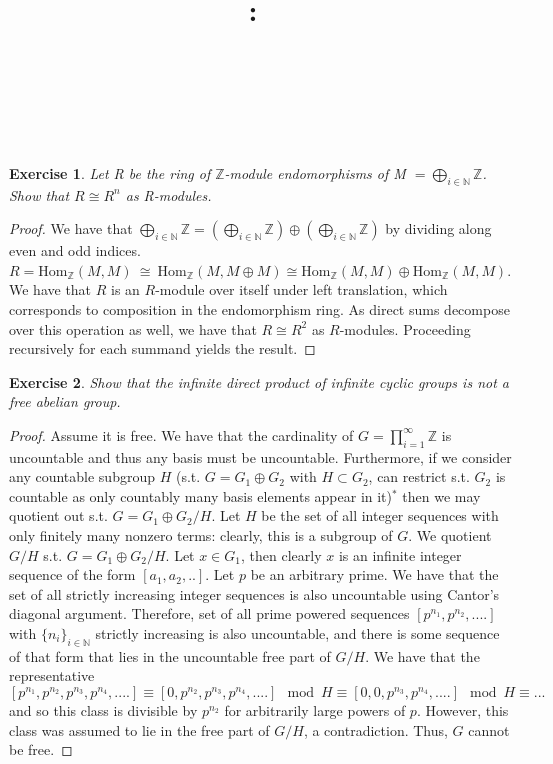 \documentclass{article}
\title{
    \vspace{2in}
    \textmd{\textbf{\hmwkClass:\ \hmwkTitle}}\\
    \vspace{0.1in}
    \textmd{\hmwkDueDate} \\
    \vspace{0.2in}\large{\textit{\hmwkClassInstructor\  }}
    \vspace{2in}
}
\author{\hmwkAuthorName}
\date{}
\newcommand{\Hom}{\text{Hom}}
\newtheorem{exercise}{Exercise}
\begin{document}
\maketitle

\pagebreak
\begin{exercise}
  Let R be the ring of $\mathbb{Z}$-module endomorphisms of M $= \bigoplus_{i \in \mathbb{N}}\mathbb{Z}$. Show that $R \cong R^{n}$ as R-modules.
\end{exercise}

\begin{proof}
  We have that $\bigoplus_{i\in \mathbb{N}}\mathbb{Z} = (\bigoplus_{i\in \mathbb{N}}\mathbb{Z})  \oplus (\bigoplus_{i\in \mathbb{N}}\mathbb{Z})$ by dividing along even and odd indices. $R = \Hom_{\mathbb{Z}}(M, M) \ \cong \ \Hom_{\mathbb{Z}}(M, M \oplus M) \cong \Hom_{\mathbb{Z}}(M,M) \oplus \Hom_{\mathbb{Z}}(M,M)$. We have that $R$ is an $R$-module over itself under left translation, which corresponds to composition in the endomorphism ring. As direct sums decompose over this operation as well, we have that $R \cong R^{2}$ as $R$-modules. Proceeding recursively for each summand yields the result.
\end{proof}

\begin{exercise}
  Show that the infinite direct product of infinite cyclic groups is not a free abelian group.
\end{exercise}

\begin{proof}
  Assume it is free. We have that the cardinality of $G = \prod_{i=1}^{\infty}\mathbb{Z}$ is uncountable and thus any basis must be uncountable. Furthermore, if we consider any countable subgroup $H$ (s.t. $G = G_{1} \oplus G_{2}$ with $H \subset G_{2}$, can restrict s.t. $G_{2}$ is countable as only countably many basis elements appear in it)$^{*}$ then we may quotient out s.t. $G = G_{1} \oplus G_{2}/H$. Let $H$ be the set of all integer sequences with only finitely many nonzero terms: clearly, this is a subgroup of $G$. We quotient $G/H$ s.t. $G = G_{1} \oplus G_{2}/H$. Let $x \in G_{1}$, then clearly $x$ is an infinite integer sequence of the form $[a_{1},a_{2},..]$. Let $p$ be an arbitrary prime. We have that the set of all strictly increasing integer sequences is also uncountable using Cantor's diagonal argument. Therefore, set of all prime powered sequences $[p^{n_{1}}, p^{n_{2}},....]$ with $\{n_{i}\}_{i\in \mathbb{N}}$ strictly increasing is also uncountable, and there is some sequence of that form that lies in the uncountable free part of $G/H$. We have that the representative $[p^{n_{1}}, p^{n_{2}}, p^{n_{3}}, p^{n_{4}},....] \equiv [0, p^{n_{2}}, p^{n_{3}}, p^{n_{4}},....] \mod H \equiv [0, 0, p^{n_{3}}, p^{n_{4}},....] \mod H \equiv ...$ and so this class is divisible by $p^{n_{2}}$ for arbitrarily large powers of $p$. However, this class was assumed to lie in the free part of $G/H$, a contradiction. Thus, $G$ cannot be free. 
\end{proof}
\end{document}
